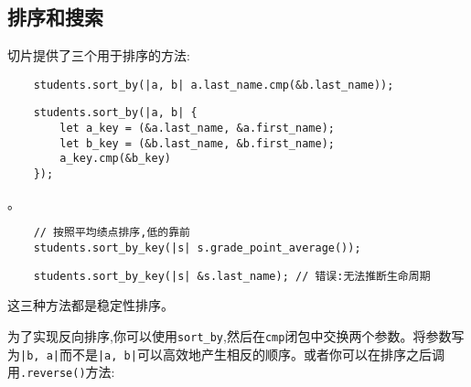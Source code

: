 \subsection{排序和搜索}
切片提供了三个用于排序的方法:



\begin{verbatim}
    students.sort_by(|a, b| a.last_name.cmp(&b.last_name));
\end{verbatim}
\begin{verbatim}
    students.sort_by(|a, b| {
        let a_key = (&a.last_name, &a.first_name);
        let b_key = (&b.last_name, &b.first_name);
        a_key.cmp(&b_key)
    });
\end{verbatim}

。
\begin{verbatim}
    // 按照平均绩点排序,低的靠前
    students.sort_by_key(|s| s.grade_point_average());
\end{verbatim}

\begin{verbatim}
    students.sort_by_key(|s| &s.last_name); // 错误:无法推断生命周期
\end{verbatim}

这三种方法都是稳定性排序。

为了实现反向排序,你可以使用\texttt{sort\_by},然后在\texttt{cmp}闭包中交换两个参数。将参数写为\texttt{|b, a|}而不是\texttt{|a, b|}可以高效地产生相反的顺序。或者你可以在排序之后调用\texttt{.reverse()}方法:

